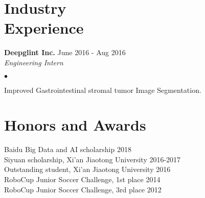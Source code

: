 \documentclass[margin,line]{res}
\newenvironment{list2}{
  \begin{list}{$\bullet$}{%
      \setlength{\itemsep}{0in}
      \setlength{\parsep}{0in} \setlength{\parskip}{0in}
      \setlength{\topsep}{0in} \setlength{\partopsep}{0in} 
      \setlength{\leftmargin}{0.2in}}}{\end{list}}
\begin{document}
\begin{resume}
\section{\sc Industry \\Experience}
{\bf Deepglint Inc.} \hfill {June 2016 - Aug 2016}\\%

\vspace{-.3in}
{\em Engineering Intern} %
\begin{list2}
\item Improved Gastrointestinal stromal tumor Image Segmentation.
\end{list2}



\section{\sc Honors and Awards} 
Baidu Big Data and AI scholarship \hfill 2018\\
Siyuan scholarship, Xi'an Jiaotong University \hfill 2016-2017\\
Outstanding student, Xi'an Jiaotong University \hfill 2016 \\
RoboCup Junior Soccer Challenge, 1st place \hfill 2014\\
RoboCup Junior Soccer Challenge, 3rd place \hfill 2012\\




\end{resume}
\end{document}
